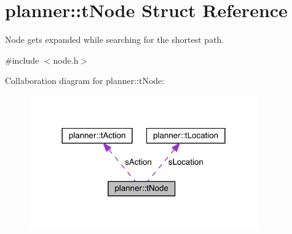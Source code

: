 \hypertarget{structplanner_1_1t_node}{}\section{planner\+:\+:t\+Node Struct Reference}
\label{structplanner_1_1t_node}


Node gets expanded while searching for the shortest path.  




{\ttfamily \#include $<$node.\+h$>$}



Collaboration diagram for planner\+:\+:t\+Node\+:\nopagebreak
\begin{figure}[H]
\begin{center}
\leavevmode
\includegraphics[width=278pt]{structplanner_1_1t_node__coll__graph}
\end{center}
\end{figure}
